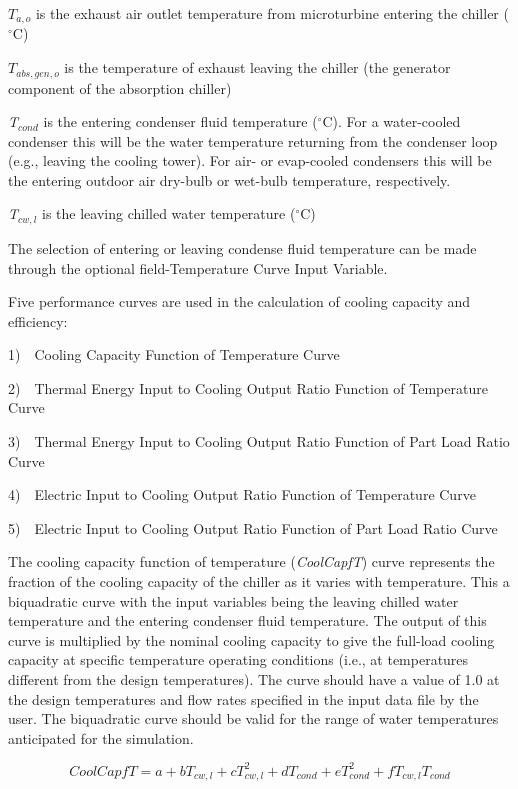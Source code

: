 \({T_{a,o}}\) is the exhaust air outlet temperature from microturbine entering the chiller (\(^{\circ}\)C)

\({T_{abs,gen,o}}\) is the temperature of exhaust leaving the chiller (the generator component of the absorption chiller)

\emph{T\(_{cond}\)} is the entering condenser fluid temperature (\(^{\circ}\)C). For a water-cooled condenser this will be the water temperature returning from the condenser loop (e.g., leaving the cooling tower). For air- or evap-cooled condensers this will be the entering outdoor air dry-bulb or wet-bulb temperature, respectively.

\emph{T\(_{cw,l}\)} is the leaving chilled water temperature (\(^{\circ}\)C)

The selection of entering or leaving condense fluid temperature can be made through the optional field-Temperature Curve Input Variable.

Five performance curves are used in the calculation of cooling capacity and efficiency:

1)~~Cooling Capacity Function of Temperature Curve

2)~~Thermal Energy Input to Cooling Output Ratio Function of Temperature Curve

3)~~Thermal Energy Input to Cooling Output Ratio Function of Part Load Ratio Curve

4)~~Electric Input to Cooling Output Ratio Function of Temperature Curve

5)~~Electric Input to Cooling Output Ratio Function of Part Load Ratio Curve

The cooling capacity function of temperature (\emph{CoolCapfT}) curve represents the fraction of the cooling capacity of the chiller as it varies with temperature. This a biquadratic curve with the input variables being the leaving chilled water temperature and the entering condenser fluid temperature. The output of this curve is multiplied by the nominal cooling capacity to give the full-load cooling capacity at specific temperature operating conditions (i.e., at temperatures different from the design temperatures). The curve should have a value of 1.0 at the design temperatures and flow rates specified in the input data file by the user. The biquadratic curve should be valid for the range of water temperatures anticipated for the simulation.

\begin{equation}
CoolCapfT = a + b{T_{cw,l}} + cT_{cw,l}^2 + d{T_{cond}} + eT_{cond}^2 + f{T_{cw,l}}{T_{cond}}
\end{equation}


